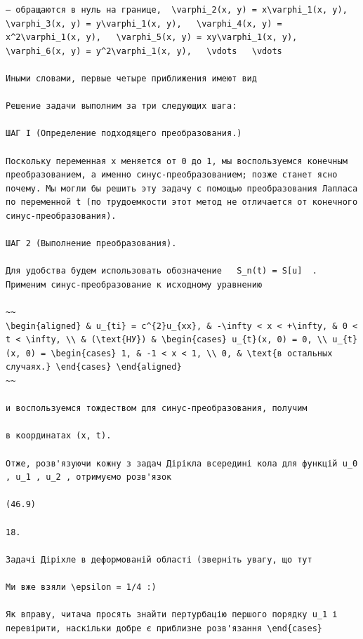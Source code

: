 \documentclass[
  ukrainian,
]{article}
\begin{document}
\begin{verbatim}
— обращаются в нуль на границе,  \varphi_2(x, y) = x\varphi_1(x, y),   \varphi_3(x, y) = y\varphi_1(x, y),   \varphi_4(x, y) = x^2\varphi_1(x, y),   \varphi_5(x, y) = xy\varphi_1(x, y),   \varphi_6(x, y) = y^2\varphi_1(x, y),   \vdots   \vdots

Иными словами, первые четыре приближения имеют вид

Решение задачи выполним за три следующих шага:

ШАГ І (Определение подходящего преобразования.)

Поскольку переменная x меняется от 0 до 1, мы воспользуемся конечным преобразованием, а именно синус-преобразованием; позже станет ясно почему. Мы могли бы решить эту задачу с помощью преобразования Лапласа по переменной t (по трудоемкости этот метод не отличается от конечного синус-преобразования).

ШАГ 2 (Выполнение преобразования).

Для удобства будем использовать обозначение   S_n(t) = S[u]  . Применим синус-преобразование к исходному уравнению

~~
\begin{aligned} & u_{ti} = c^{2}u_{xx}, & -\infty < x < +\infty, & 0 < t < \infty, \\ & (\text{НУ}) & \begin{cases} u_{t}(x, 0) = 0, \\ u_{t}(x, 0) = \begin{cases} 1, & -1 < x < 1, \\ 0, & \text{в остальных случаях.} \end{cases} \end{aligned}
~~

и воспользуемся тождеством для синус-преобразования, получим

в координатах (x, t).

Отже, розв'язуючи кожну з задач Дірікла всередині кола для функцій u_0 , u_1 , u_2 , отримуємо розв'язок

(46.9)

18.

Задачі Діріхле в деформованій області (зверніть увагу, що тут

Ми вже взяли \epsilon = 1/4 :)

Як вправу, читача просять знайти пертурбацію першого порядку u_1 і перевірити, наскільки добре є приблизне розв'язання \end{cases}
\end{verbatim}
\end{document}
